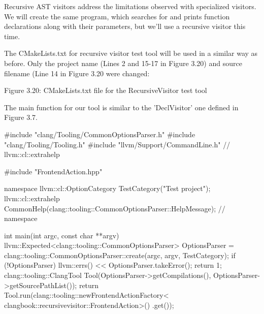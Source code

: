 Recursive AST visitors address the limitations observed with specialized visitors. We will create the same program, which searches for and prints function declarations along with their parameters, but we'll use a recursive visitor this time.

The CMakeLists.txt for recursive visitor test tool will be used in a similar way as before. Only the project name (Lines 2 and 15-17 in Figure 3.20) and source filename (Line 14 in Figure 3.20 were changed:


\begin{center}
Figure 3.20: CMakeLists.txt file for the RecursiveVisitor test tool
\end{center}

The main function for our tool is similar to the 'DeclVisitor' one defined in Figure 3.7.

\begin{cpp}
#include "clang/Tooling/CommonOptionsParser.h"
#include "clang/Tooling/Tooling.h"
#include "llvm/Support/CommandLine.h" // llvm::cl::extrahelp

#include "FrontendAction.hpp"

namespace {
llvm::cl::OptionCategory TestCategory("Test project");
llvm::cl::extrahelp
  CommonHelp(clang::tooling::CommonOptionsParser::HelpMessage);
} // namespace

int main(int argc, const char **argv) {
  llvm::Expected<clang::tooling::CommonOptionsParser> OptionsParser =
    clang::tooling::CommonOptionsParser::create(argc, argv, TestCategory);
  if (!OptionsParser) {
    llvm::errs() << OptionsParser.takeError();
    return 1;
  }
  clang::tooling::ClangTool Tool(OptionsParser->getCompilations(),
                                 OptionsParser->getSourcePathList());
  return Tool.run(clang::tooling::newFrontendActionFactory<
                    clangbook::recursivevisitor::FrontendAction>()
                    .get());
}
\end{cpp}

